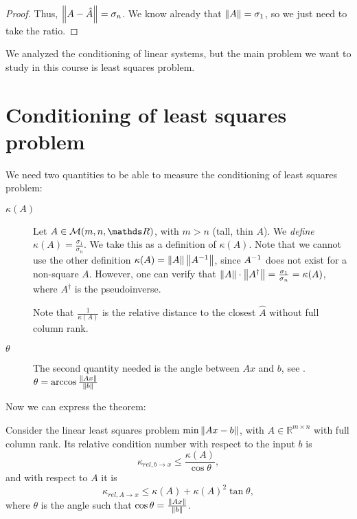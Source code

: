 \documentclass[computationalMathematics.tex]{subfiles}
\begin{document}
\begin{proof}
Thus, $\left\lVert A - \hat{A}\right\rVert = \sigma_n$. We know already that $\left\lVert A\right\rVert=\sigma_1$, so we just need to take the ratio.
\end{proof}


We analyzed the conditioning of linear systems, but the main problem we want to study in this course is least squares problem.

\section{Conditioning of least squares problem}

We need two quantities to be able to measure the conditioning of least squares problem:

\begin{description}
  \item[ $\kappa(A)$]
Let $A \in \mathcal{M}(m, n, \R)$, with $m > n$ (tall, thin $A$). We \emph{define} $\kappa(A) = \frac{\sigma_1}{\sigma_n}$. We take this as a definition of $\kappa(A)$. Note that we cannot use the other definition $\kappa(A)=\left\lVert A\right\rVert\left\lVert{A}^{-1}\right\rVert$, since ${A}^{-1}$ does not exist for a non-square $A$. However, one can verify that $\left\lVert A\right\rVert \cdot \left\lVert A^{\dag}\right\rVert = \frac{\sigma_1}{\sigma_n}=\kappa(A)$, where $A^\dag$ is the pseudoinverse.

\begin{obs}
  Note that $\frac{1}{\kappa(A)}$ is the relative distance to the closest $\hat{A}$ without full column rank.
\end{obs}

  \item[ $\theta$]
    The second quantity needed is the angle between $Ax$ and $b$, see .
$\theta = \arccos \frac{\left\lVert Ax\right\rVert}{\left\lVert b\right\rVert}$
\end{description}

Now we can express the theorem:

\begin{theorem}
Consider the linear least squares problem $\min \left\lVert Ax-b\right\rVert$, with $A\in\mathbb{R}^{m\times n}$ with full column rank. Its relative condition number with respect to the input $b$ is
\[
\kappa_{rel, b \to x} \leq \frac{\kappa(A)}{\cos\theta},
\]
and with respect to $A$ it is
\[
  \kappa_{rel, A \to x} \leq \kappa(A) + {\kappa(A)}^2 \tan \theta,
\]
where $\theta$ is the angle such that $\cos \theta = \frac{\left\lVert Ax\right\rVert}{\left\lVert b\right\rVert}$.
\end{theorem}
\end{document}
